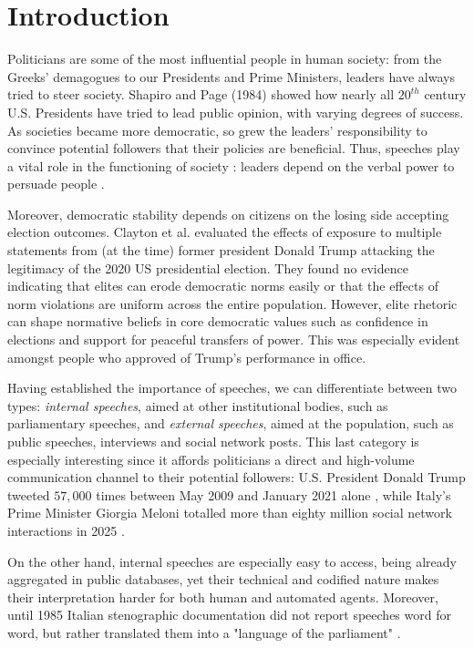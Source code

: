 \section{Introduction}

Politicians are some of the most influential people in human society: from the Greeks' demagogues to our Presidents and Prime Ministers, leaders have always tried to steer society. Shapiro and Page (1984) \cite{page_presidents_1984} showed how nearly all $20^{th}$ century U.S. Presidents have tried to lead public opinion, with varying degrees of success. As societies became more democratic, so grew the leaders' responsibility to convince potential followers that their policies are beneficial. Thus, speeches play a vital role in the functioning of society \cite{beard_language_2000}: leaders depend on the verbal power to persuade people \cite{charteris-black_persuasion_2011}.

Moreover, democratic stability depends on citizens on the losing side accepting election outcomes. Clayton et al. \cite{clayton_elite_2021} evaluated the effects of exposure to multiple statements from (at the time) former president Donald Trump attacking the legitimacy of the 2020 US presidential election. They found no evidence indicating that elites can erode democratic norms easily or that the effects of norm violations are uniform across the entire population. However, elite rhetoric can shape normative beliefs in core democratic values such as confidence in elections and support for peaceful transfers of power. This was especially evident amongst people who approved of Trump's performance in office.

Having established the importance of speeches, we can differentiate between two types: \textit{internal speeches}, aimed at other institutional bodies, such as parliamentary speeches, and \textit{external speeches}, aimed at the population, such as public speeches, interviews and social network posts. This last category is especially interesting since it affords politicians a direct and high-volume communication channel to their potential followers: U.S. President Donald Trump tweeted $57,000$ times between May 2009 and January 2021 alone \cite{madhani_farewell_2021}, while Italy's Prime Minister Giorgia Meloni totalled more than eighty million social network interactions in 2025 \cite{vinci_meloni_2025}.

On the other hand, internal speeches are especially easy to access, being already aggregated in public databases, yet their technical and codified nature makes their interpretation harder for both human and automated agents. Moreover, until 1985 Italian stenographic documentation did not report speeches word for word, but rather translated them into a "language of the parliament" \cite{holtus_dal_1985,mohrhoff_dalla_1987}.
